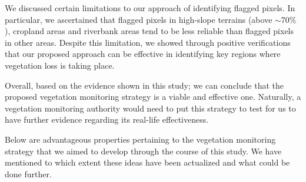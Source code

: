 \justify
We discussed certain limitations to our approach of identifying flagged pixels. In particular, we ascertained that flagged pixels in high-slope terrains (above $\sim$70$\%$), cropland areas and riverbank areas tend to be less reliable than flagged pixels in other areas. Despite this limitation, we showed through positive verifications that our proposed approach can be effective in identifying key regions where vegetation loss is taking place. 

\justify
Overall, based on the evidence shown in this study; we can conclude that the proposed vegetation monitoring strategy is a viable and effective one. Naturally, a vegetation monitoring authority would need to put this strategy to test for us to have further evidence regarding its real-life effectiveness.

\justify
Below are advantageous properties pertaining to the vegetation monitoring strategy that we aimed to develop through the course of this study. We have mentioned to which extent these ideas have been actualized and what could be done further.

